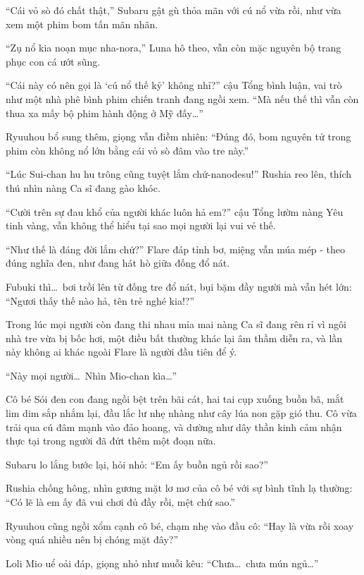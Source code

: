 \documentclass[../main.tex]{subfiles}
\begin{document}
``Cái vỏ sò đó chất thật,'' Subaru gật gù thỏa mãn với cú nổ vừa rồi, như vừa xem một phim bom tấn mãn nhãn.

``Zụ nổ kia noạn mục nha-nora,'' Luna hô theo, vẫn còn mặc nguyên bộ trang phục con cá ướt sũng.

``Cái này có nên gọi là `cú nổ thế kỷ' không nhỉ?'' cậu Tổng bình luận, vai trò như một nhà phê bình phim chiến tranh đang ngồi xem. ``Mà nếu thế thì vẫn còn thua xa mấy bộ phim hành động ở Mỹ đấy\dots''

Ryuuhou bổ sung thêm, giọng vẫn điềm nhiên: ``Đúng đó, bom nguyên tử trong phim còn không nổ lớn bằng cái vỏ sò đâm vào tre này.''

``Lúc Sui-chan hu hu trông cũng tuyệt lắm chứ-nanodesu!'' Rushia reo lên, thích thú nhìn nàng Ca sĩ đang gào khóc.

``Cười trên sự đau khổ của người khác luôn hả em?'' cậu Tổng lườm nàng Yêu tinh vàng, vẫn không thể hiểu tại sao mọi người lại vui vẻ thế.

``Như thế là đáng đời lắm chứ?'' Flare đáp tỉnh bơ, miệng vẫn múa mép - theo đúng nghĩa đen, như đang hát hò giữa đống đổ nát.

Fubuki thì\dots\ bơi trồi lên từ đống tre đổ nát, bụi bặm đầy người mà vẫn hét lớn: ``Ngươi thấy thế nào hả, tên trẻ nghé kia!?''

Trong lúc mọi người còn đang thi nhau mỉa mai nàng Ca sĩ đang rên rỉ vì ngôi nhà tre vừa bị bốc hơi, một điều bất thường khác lại âm thầm diễn ra, và lần này không ai khác ngoài Flare là người đầu tiên để ý.

``Này mọi người\dots\ Nhìn Mio-chan kìa\dots''

Cô bé Sói đen con đang ngồi bệt trên bãi cát, hai tai cụp xuống buồn bã, mắt lim dim sắp nhắm lại, đầu lắc lư nhẹ nhàng như cây lúa non gặp gió thu. Cô vừa trải qua cú đâm mạnh vào đảo hoang, và dường như dây thần kinh cảm nhận thực tại trong người đã đứt thêm một đoạn nữa.


Subaru lo lắng bước lại, hỏi nhỏ: ``Em ấy buồn ngủ rồi sao?''

Rushia chống hông, nhìn gương mặt lơ mơ của cô bé với sự bình tĩnh lạ thường: ``Có lẽ là em ấy đã vui chơi đủ đầy rồi, mệt chứ sao.''

Ryuuhou cũng ngồi xổm cạnh cô bé, chạm nhẹ vào đầu cô: ``Hay là vừa rồi xoay vòng quá nhiều nên bị chóng mặt đây?''

Loli Mio uể oải đáp, giọng nhỏ như muỗi kêu: ``Chưa\dots\ chưa mún ngủ\dots''
\end{document}
